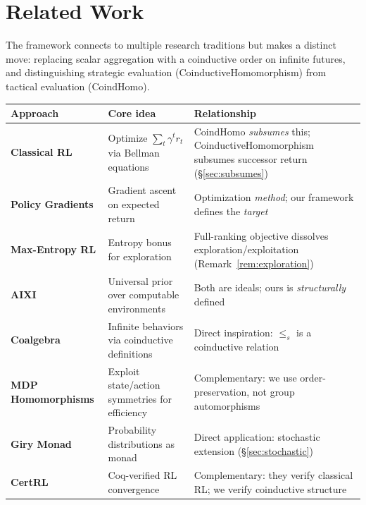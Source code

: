 \documentclass[9pt,a4paper]{article}
\theoremstyle{plain}
\theoremstyle{definition}
\theoremstyle{remark}
\begin{document}
\section{Related Work}

The framework connects to multiple research traditions but makes a distinct move: replacing scalar aggregation with a coinductive order on infinite futures, and distinguishing strategic evaluation (CoinductiveHomomorphism) from tactical evaluation (CoindHomo).

\begin{table}[H]
\centering
\small
\renewcommand{\arraystretch}{1.2}
\begin{tabularx}{\textwidth}{|>{\raggedright\arraybackslash}p{}|>{\raggedright\arraybackslash}X|>{\raggedright\arraybackslash}X|}
\hline
\textbf{Approach} & \textbf{Core idea} & \textbf{Relationship} \\
\hline
\textbf{Classical RL} \cite{Sutton2018} & Optimize $\sum_t \gamma^t r_t$ via Bellman equations & CoindHomo \emph{subsumes} this; CoinductiveHomomorphism subsumes successor return (\S\ref{sec:subsumes}) \\
\hline
\textbf{Policy Gradients} \cite{Williams1992} & Gradient ascent on expected return & Optimization \emph{method}; our framework defines the \emph{target} \\
\hline
\textbf{Max-Entropy RL} \cite{Haarnoja2018} & Entropy bonus for exploration & Full-ranking objective dissolves exploration/exploitation (Remark~\ref{rem:exploration}) \\
\hline
\textbf{AIXI} \cite{Hutter2005} & Universal prior over computable environments & Both are ideals; ours is \emph{structurally} defined \\
\hline
\textbf{Coalgebra} \cite{Rutten2000} & Infinite behaviors via coinductive definitions & Direct inspiration: $\le_s$ is a coinductive relation \\
\hline
\textbf{MDP Homomorphisms} \cite{vanderPol2020} & Exploit state/action symmetries for efficiency & Complementary: we use order-preservation, not group automorphisms \\
\hline
\textbf{Giry Monad} \cite{Giry1982} & Probability distributions as monad & Direct application: stochastic extension (\S\ref{sec:stochastic}) \\
\hline
\textbf{CertRL} \cite{Vajjha2021} & Coq-verified RL convergence & Complementary: they verify classical RL; we verify coinductive structure \\
\hline
\end{tabularx}
\end{table}
\end{document}
